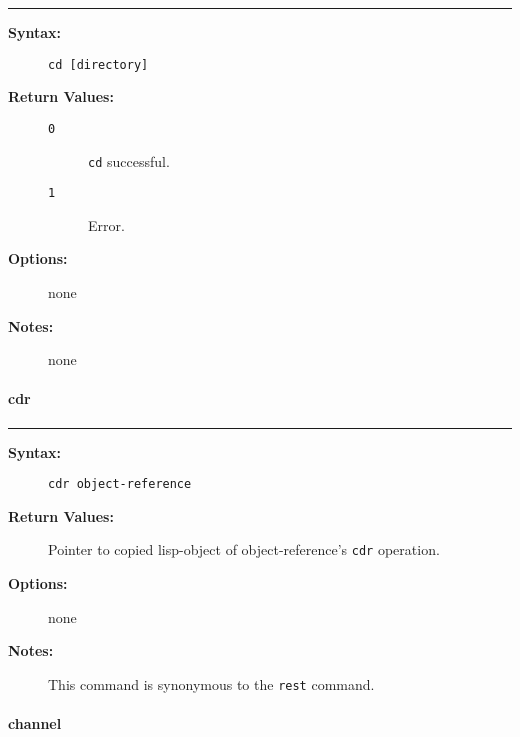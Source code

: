 \hrule
\begin{description}
\item[{\bf Syntax:}] \mbox{}

{\tt cd [directory]}

\item[{\bf Return Values:}] \mbox{}

\begin{description}
\item[{\tt 0}] \mbox{}

{\tt cd} successful.

\item[{\tt 1}] \mbox{}

Error.

\end{description}


\item[{\bf Options:}] \mbox{}

none  

\item[{\bf Notes:}] \mbox{}

none  

\end{description}


\vspace {2pt}


\paragraph{cdr}

\hrule
\begin{description}
\item[{\bf Syntax:}] \mbox{}

{\tt cdr object-reference}

\item[{\bf Return Values:}] \mbox{}

Pointer to copied lisp-object of 
object-reference's {\tt cdr} operation.

\item[{\bf Options:}] \mbox{}

none  

\item[{\bf Notes:}] \mbox{}

This command is synonymous to the {\tt rest}
command.

\end{description}


\vspace {2pt}


\paragraph{channel}


